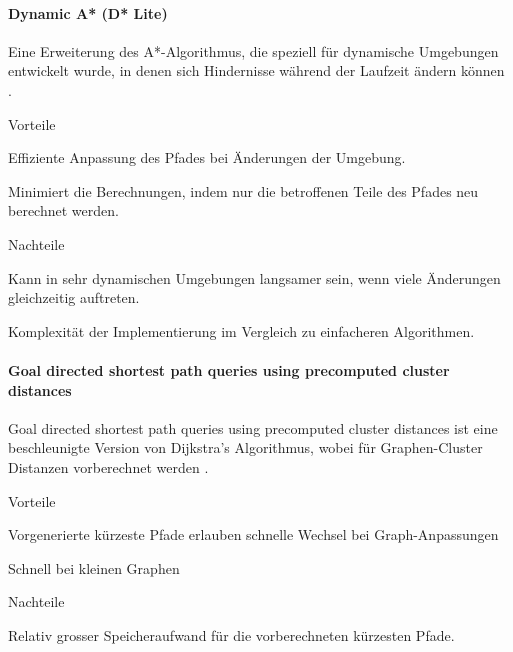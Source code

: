 \documentclass[../main.tex]{subfiles}
\begin{document}
\paragraph{Dynamic A* (D* Lite)}

Eine Erweiterung des A*-Algorithmus, die speziell für dynamische Umgebungen entwickelt wurde, in denen sich Hindernisse während der Laufzeit ändern können \cite{d_star}.

\begin{minipage}[t]{0.48\textwidth}
\begin{items}
  \item [Vorteile]
  \item Effiziente Anpassung des Pfades bei Änderungen der Umgebung.
  \item Minimiert die Berechnungen, indem nur die betroffenen Teile des Pfades neu berechnet werden.
\end{items}
\end{minipage}
\hfill
\begin{minipage}[t]{0.48\textwidth}
\begin{items}
  \item [Nachteile]
  \item Kann in sehr dynamischen Umgebungen langsamer sein, wenn viele Änderungen gleichzeitig auftreten.
  \item Komplexität der Implementierung im Vergleich zu einfacheren Algorithmen.
\end{items}
\end{minipage}


\paragraph{Goal directed shortest path queries using precomputed cluster distances}

Goal directed shortest path queries using precomputed cluster distances ist eine beschleunigte Version von Dijkstra's Algorithmus, wobei für Graphen-Cluster Distanzen vorberechnet werden \cite{goal_directed_queries}.

\begin{minipage}[t]{0.48\textwidth}
\begin{items}
  \item [Vorteile]
  \item Vorgenerierte kürzeste Pfade erlauben schnelle Wechsel bei Graph-Anpassungen
  \item Schnell bei kleinen Graphen
\end{items}
\end{minipage}
\hfill
\begin{minipage}[t]{0.48\textwidth}
\begin{items}
  \item [Nachteile]
  \item Relativ grosser Speicheraufwand für die vorberechneten kürzesten Pfade.
\end{items}
\end{minipage}
\end{document}
